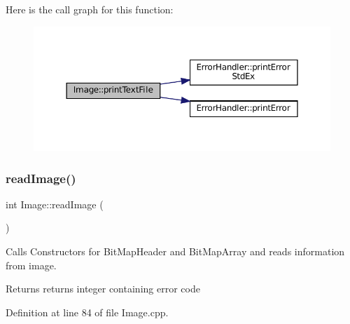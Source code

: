 Here is the call graph for this function\+:
\nopagebreak
\begin{figure}[H]
\begin{center}
\leavevmode
\includegraphics[width=350pt]{classImage_ae5daf791502caefeae1b15360d354513_cgraph}
\end{center}
\end{figure}
\mbox{\label{classImage_ac0aa1f41cb368d87b20dd38839218d93}} 
\subsubsection{\texorpdfstring{readImage()}{readImage()}}
{\footnotesize\ttfamily int Image\+::read\+Image (\begin{DoxyParamCaption}{ }\end{DoxyParamCaption})}



Calls Constructors for Bit\+Map\+Header and Bit\+Map\+Array and reads information from image. 

\begin{DoxyReturn}{Returns}
returns integer containing error code 
\end{DoxyReturn}


Definition at line 84 of file Image.\+cpp.

